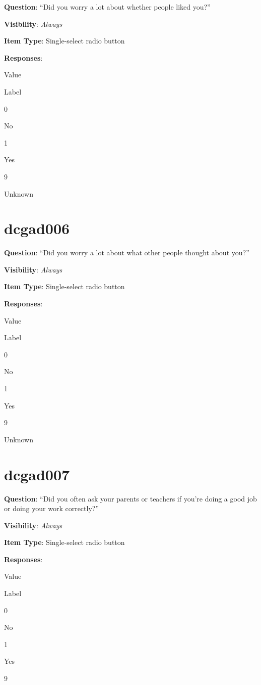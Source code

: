 \documentclass[]{book}
\begin{document}
\textbf{Question}: ``Did you worry a lot about whether people liked you?''

\textbf{Visibility}: \emph{Always}

\textbf{Item Type}: Single-select radio button

\textbf{Responses}:

Value

Label

0

No

1

Yes

9

Unknown

\hypertarget{dcgad006}{%
\section{dcgad006}\label{dcgad006}}

\textbf{Question}: ``Did you worry a lot about what other people thought about you?''

\textbf{Visibility}: \emph{Always}

\textbf{Item Type}: Single-select radio button

\textbf{Responses}:

Value

Label

0

No

1

Yes

9

Unknown

\hypertarget{dcgad007}{%
\section{dcgad007}\label{dcgad007}}

\textbf{Question}: ``Did you often ask your parents or teachers if you're doing a good job or doing your work correctly?''

\textbf{Visibility}: \emph{Always}

\textbf{Item Type}: Single-select radio button

\textbf{Responses}:

Value

Label

0

No

1

Yes

9
\end{document}
